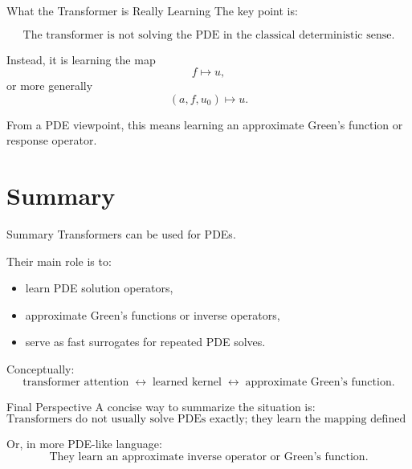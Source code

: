 \documentclass{beamer}
\begin{document}

\begin{frame}{What the Transformer is Really Learning}
The key point is:

\[
\boxed{
\text{The transformer is not solving the PDE in the classical deterministic sense.}
}
\]

Instead, it is learning the map
\[
f \mapsto u,
\]
or more generally
\[
(a,f,u_0) \mapsto u.
\]

From a PDE viewpoint, this means learning an approximate Green's function or response operator.
\end{frame}

\section{Summary}

\begin{frame}{Summary}
Transformers can be used for PDEs.

\medskip

Their main role is to:
\begin{itemize}
\item learn PDE solution operators,
\item approximate Green's functions or inverse operators,
\item serve as fast surrogates for repeated PDE solves.
\end{itemize}

Conceptually:
\[
\text{transformer attention}
\;\longleftrightarrow\;
\text{learned kernel}
\;\longleftrightarrow\;
\text{approximate Green's function}.
\]
\end{frame}


\begin{frame}{Final Perspective}
A concise way to summarize the situation is:
\[
\boxed{
\text{Transformers do not usually solve PDEs exactly; they learn the mapping defined by the PDE.}
}
\]

Or, in more PDE-like language:
\[
\boxed{
\text{They learn an approximate inverse operator or Green's function.}
}
\]
\end{frame}
\end{document}
